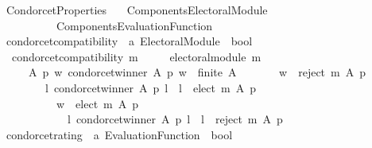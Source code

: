 %
\begin{isabellebody}%
%
%
\isadelimtheory
%
\endisadelimtheory
%
\isatagtheory
{}\isamarkupfalse%
\ Condorcet{\isacharunderscore}{\kern0pt}Properties\isanewline
\ \ \ {\isachardoublequoteopen}{\isachardot}{\kern0pt}{\isachardot}{\kern0pt}{\isacharslash}{\kern0pt}Components{\isacharslash}{\kern0pt}Electoral{\isacharunderscore}{\kern0pt}Module{\isachardoublequoteclose}\isanewline
\ \ \ \ \ \ \ \ \ \ {\isachardoublequoteopen}{\isachardot}{\kern0pt}{\isachardot}{\kern0pt}{\isacharslash}{\kern0pt}Components{\isacharslash}{\kern0pt}Evaluation{\isacharunderscore}{\kern0pt}Function{\isachardoublequoteclose}\isanewline
\isanewline
{}%
\endisatagtheory
{\isafoldtheory}%
%
\isadelimtheory
\isanewline
%
\endisadelimtheory
\isanewline
{}\isamarkupfalse%
\ condorcet{\isacharunderscore}{\kern0pt}compatibility\ {\isacharcolon}{\kern0pt}{\isacharcolon}{\kern0pt}\ {\isachardoublequoteopen}{\isacharprime}{\kern0pt}a\ Electoral{\isacharunderscore}{\kern0pt}Module\ {\isasymRightarrow}\ bool{\isachardoublequoteclose}\ \isanewline
\ \ {\isachardoublequoteopen}condorcet{\isacharunderscore}{\kern0pt}compatibility\ m\ {\isasymequiv}\isanewline
\ \ \ \ electoral{\isacharunderscore}{\kern0pt}module\ m\ {\isasymand}\isanewline
\ \ \ \ {\isacharparenleft}{\kern0pt}{\isasymforall}\ A\ p\ w{\isachardot}{\kern0pt}\ condorcet{\isacharunderscore}{\kern0pt}winner\ A\ p\ w\ {\isasymand}\ finite\ A\ {\isasymlongrightarrow}\isanewline
\ \ \ \ \ \ {\isacharparenleft}{\kern0pt}w\ {\isasymnotin}\ reject\ m\ A\ p\ {\isasymand}\isanewline
\ \ \ \ \ \ \ \ {\isacharparenleft}{\kern0pt}{\isasymforall}l{\isachardot}{\kern0pt}\ {\isasymnot}condorcet{\isacharunderscore}{\kern0pt}winner\ A\ p\ l\ {\isasymlongrightarrow}\ l\ {\isasymnotin}\ elect\ m\ A\ p{\isacharparenright}{\kern0pt}\ {\isasymand}\isanewline
\ \ \ \ \ \ \ \ \ \ {\isacharparenleft}{\kern0pt}w\ {\isasymin}\ elect\ m\ A\ p\ {\isasymlongrightarrow}\isanewline
\ \ \ \ \ \ \ \ \ \ \ \ {\isacharparenleft}{\kern0pt}{\isasymforall}l{\isachardot}{\kern0pt}\ {\isasymnot}condorcet{\isacharunderscore}{\kern0pt}winner\ A\ p\ l\ {\isasymlongrightarrow}\ l\ {\isasymin}\ reject\ m\ A\ p{\isacharparenright}{\kern0pt}{\isacharparenright}{\kern0pt}{\isacharparenright}{\kern0pt}{\isacharparenright}{\kern0pt}{\isachardoublequoteclose}\isanewline
\isanewline
\isanewline
{}\isamarkupfalse%
\ condorcet{\isacharunderscore}{\kern0pt}rating\ {\isacharcolon}{\kern0pt}{\isacharcolon}{\kern0pt}\ {\isachardoublequoteopen}{\isacharprime}{\kern0pt}a\ Evaluation{\isacharunderscore}{\kern0pt}Function\ {\isasymRightarrow}\ bool{\isachardoublequoteclose}\ \isanewline

\end{isabellebody}
